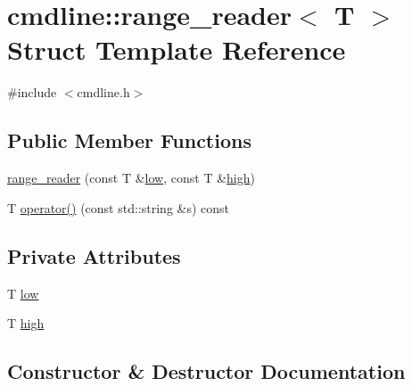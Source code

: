 \hypertarget{structcmdline_1_1range__reader}{}\section{cmdline\+::range\+\_\+reader$<$ T $>$ Struct Template Reference}
\label{structcmdline_1_1range__reader}


{\ttfamily \#include $<$cmdline.\+h$>$}

\subsection*{Public Member Functions}
\begin{DoxyCompactItemize}
\item 
\mbox{\hyperlink{structcmdline_1_1range__reader_a7b31d754293d2f2f3df49b40a6e95a5a}{range\+\_\+reader}} (const T \&\mbox{\hyperlink{structcmdline_1_1range__reader_a60c345e84d2a96dcd2de47a66eca8104}{low}}, const T \&\mbox{\hyperlink{structcmdline_1_1range__reader_ad1ef134b223c59257fff990b99c54ee4}{high}})
\item 
T \mbox{\hyperlink{structcmdline_1_1range__reader_a81dfb7277756d5b23f816481db121a20}{operator()}} (const std\+::string \&s) const
\end{DoxyCompactItemize}
\subsection*{Private Attributes}
\begin{DoxyCompactItemize}
\item 
T \mbox{\hyperlink{structcmdline_1_1range__reader_a60c345e84d2a96dcd2de47a66eca8104}{low}}
\item 
T \mbox{\hyperlink{structcmdline_1_1range__reader_ad1ef134b223c59257fff990b99c54ee4}{high}}
\end{DoxyCompactItemize}


\subsection{Constructor \& Destructor Documentation}
\mbox{\label{structcmdline_1_1range__reader_a7b31d754293d2f2f3df49b40a6e95a5a}} 
